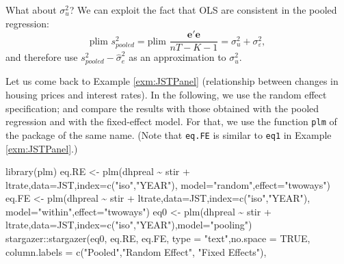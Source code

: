 \documentclass[
  12pt,
]{book}
\newenvironment{Shaded}{\begin{snugshade}}{\end{snugshade}}
\newcommand{\AttributeTok}[1]{\textcolor[rgb]{0.77,0.63,0.00}{#1}}
\newcommand{\ConstantTok}[1]{\textcolor[rgb]{0.00,0.00,0.00}{#1}}
\newcommand{\FunctionTok}[1]{\textcolor[rgb]{0.00,0.00,0.00}{#1}}
\newcommand{\NormalTok}[1]{#1}
\newcommand{\OtherTok}[1]{\textcolor[rgb]{0.56,0.35,0.01}{#1}}
\newcommand{\SpecialCharTok}[1]{\textcolor[rgb]{0.00,0.00,0.00}{#1}}
\newcommand{\StringTok}[1]{\textcolor[rgb]{0.31,0.60,0.02}{#1}}
\theoremstyle{definition}
\theoremstyle{definition}
\theoremstyle{definition}
\theoremstyle{definition}
\theoremstyle{remark}
\begin{document}
What about \(\sigma_u^2\)? We can exploit the fact that OLS are consistent in the pooled regression:
\[
\mbox{plim }s^2_{pooled} = \mbox{plim }\frac{\mathbf{e}'\mathbf{e}}{nT-K-1} = \sigma_u^2 + \sigma_\varepsilon^2,
\]
and therefore use \(s^2_{pooled} - \hat{\sigma}_e^2\) as an approximation to \(\sigma_u^2\).

Let us come back to Example \ref{exm:JSTPanel} (relationship between changes in housing prices and interest rates). In the following, we use the random effect specification; and compare the results with those obtained with the pooled regression and with the fixed-effect model. For that, we use the function \texttt{plm} of the package of the same name. (Note that \texttt{eq.FE} is similar to \texttt{eq1} in Example \ref{exm:JSTPanel}.)

\begin{Shaded}
\begin{Highlighting}[]
\FunctionTok{library}\NormalTok{(plm)}
\NormalTok{eq.RE }\OtherTok{\textless{}{-}} \FunctionTok{plm}\NormalTok{(dhpreal }\SpecialCharTok{\textasciitilde{}}\NormalTok{ stir }\SpecialCharTok{+}\NormalTok{ ltrate,}\AttributeTok{data=}\NormalTok{JST,}\AttributeTok{index=}\FunctionTok{c}\NormalTok{(}\StringTok{"iso"}\NormalTok{,}\StringTok{"YEAR"}\NormalTok{),}
             \AttributeTok{model=}\StringTok{"random"}\NormalTok{,}\AttributeTok{effect=}\StringTok{"twoways"}\NormalTok{)}
\NormalTok{eq.FE }\OtherTok{\textless{}{-}} \FunctionTok{plm}\NormalTok{(dhpreal }\SpecialCharTok{\textasciitilde{}}\NormalTok{ stir }\SpecialCharTok{+}\NormalTok{ ltrate,}\AttributeTok{data=}\NormalTok{JST,}\AttributeTok{index=}\FunctionTok{c}\NormalTok{(}\StringTok{"iso"}\NormalTok{,}\StringTok{"YEAR"}\NormalTok{),}
             \AttributeTok{model=}\StringTok{"within"}\NormalTok{,}\AttributeTok{effect=}\StringTok{"twoways"}\NormalTok{)}
\NormalTok{eq0   }\OtherTok{\textless{}{-}} \FunctionTok{plm}\NormalTok{(dhpreal }\SpecialCharTok{\textasciitilde{}}\NormalTok{ stir }\SpecialCharTok{+}\NormalTok{ ltrate,}\AttributeTok{data=}\NormalTok{JST,}\AttributeTok{index=}\FunctionTok{c}\NormalTok{(}\StringTok{"iso"}\NormalTok{,}\StringTok{"YEAR"}\NormalTok{),}\AttributeTok{model=}\StringTok{"pooling"}\NormalTok{) }
\NormalTok{stargazer}\SpecialCharTok{::}\FunctionTok{stargazer}\NormalTok{(eq0, eq.RE, eq.FE, }\AttributeTok{type =} \StringTok{"text"}\NormalTok{,}\AttributeTok{no.space =} \ConstantTok{TRUE}\NormalTok{,}
                     \AttributeTok{column.labels =} \FunctionTok{c}\NormalTok{(}\StringTok{"Pooled"}\NormalTok{,}\StringTok{"Random Effect"}\NormalTok{, }\StringTok{"Fixed Effects"}\NormalTok{),}

\end{Highlighting}
\end{Shaded}
\end{document}
